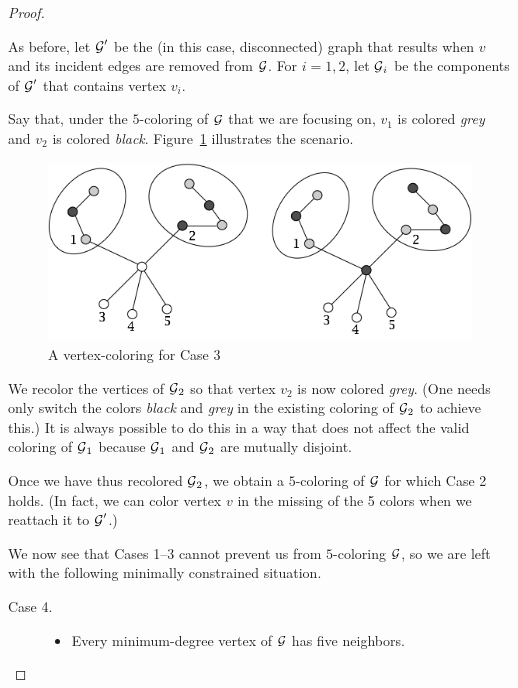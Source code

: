 \begin{proof}
\begin{description}
\smallskip

As before, let $\mbox{$\cal G$}'$ be the (in this case, disconnected) graph that results when $v$ and its incident edges are removed from $\mbox{$\cal G$}$.  
For $i=1,2$, let $\mbox{$\cal G$}_i$ be the components of $\mbox{$\cal G$}'$ that contains vertex $v_i$.

Say that, under the $5$-coloring of $\mbox{$\cal G$}$ that we are focusing on, $v_1$ is colored {\it grey} and $v_2$ is colored {\it black}. 
Figure~\ref{fig:5colorsCase3} illustrates the scenario.
\begin{figure}[hbt]
\begin{center}
   \includegraphics[scale=0.4]{FiguresGraph/5colorsCase1}
\caption{A vertex-coloring for Case 3}
  \label{fig:5colorsCase3}
\end{center}
\end{figure}

We recolor the vertices of $\mbox{$\cal G$}_2$ so that vertex $v_2$ is now colored {\it grey}.  (One needs only switch the colors {\it black} and {\it grey} in the existing coloring of $\mbox{$\cal G$}_2$ to achieve this.)  It is always possible to do this in a way that does not affect the valid coloring of $\mbox{$\cal G$}_1$ because $\mbox{$\cal G$}_1$ and $\mbox{$\cal G$}_2$ are mutually disjoint.

\smallskip

Once we have thus recolored $\mbox{$\cal G$}_2$, we obtain a $5$-coloring of $\mbox{$\cal G$}$ for which Case 2 holds.  (In fact, we can color vertex $v$ in the missing
of the 5 colors when we reattach it to $\mbox{$\cal G$}'$.)
\end{description}


\smallskip

\noindent
We now see that Cases 1--3 cannot prevent us from $5$-coloring $\mbox{$\cal G$}$, so we are left with the following minimally constrained situation.
\begin{description}
\item[{\sf Case 4}.]
\begin{itemize}
\item
Every minimum-degree vertex of $\mbox{$\cal G$}$ has five neighbors.


\end{itemize}
\end{description}
\end{proof}
